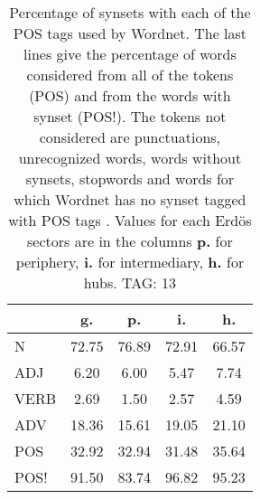 \begin{table}[h!]
\begin{center}
\begin{tabular}{| l | c | c | c | c |}\hline
 & g. & p. & i. & h. \\\hline
N & 72.75  & 76.89  & 72.91  & 66.57 \\\hline
ADJ & 6.20  & 6.00  & 5.47  & 7.74 \\\hline
VERB & 2.69  & 1.50  & 2.57  & 4.59 \\\hline
ADV & 18.36  & 15.61  & 19.05  & 21.10 \\\hline
POS & 32.92  & 32.94  & 31.48  & 35.64 \\\hline
POS! & 91.50  & 83.74  & 96.82  & 95.23 \\\hline
\end{tabular}
\caption{Percentage of synsets with each of the POS tags used by Wordnet. The last lines give the percentage of words considered from all of the tokens (POS) and from the words with synset (POS!). The tokens not considered are punctuations, unrecognized words, words without synsets, stopwords and words for which Wordnet has no synset  tagged with POS tags . Values for each Erd\"os sectors are in the columns {{\bf p.}} for periphery, {{\bf i.}} for intermediary, {{\bf h.}} for hubs. TAG: 13}
\end{center}
\end{table}